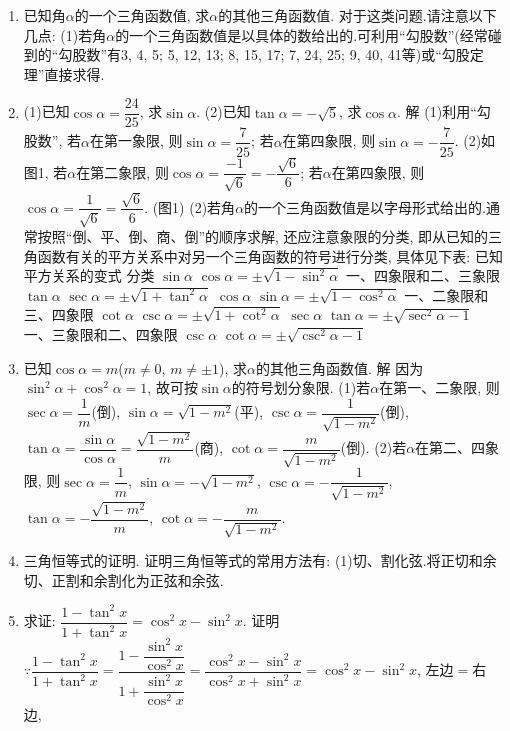 \documentclass[10pt,a4paper]{article}
\begin{document}
\begin{enumerate}[1.]

\item 已知角$\alpha$的一个三角函数值, 求$\alpha$的其他三角函数值.
对于这类问题.请注意以下几点:
(1)若角$\alpha$的一个三角函数值是以具体的数给出的.可利用``勾股数''(经常碰到的``勾股数''有3, 4, 5; 5, 12, 13; 8, 15, 17; 7, 24, 25; 9, 40, 41等)或``勾股定理''直接求得.
\item (1)已知$\cos \alpha =\dfrac{24}{25}$, 求$\sin \alpha$.		(2)已知$\tan \alpha =-\sqrt 5$, 求$\cos \alpha$.
解  (1)利用``勾股数'', 若$\alpha$在第一象限, 则$\sin \alpha =\dfrac 7{25}$; 若$\alpha$在第四象限, 则$\sin \alpha =-\dfrac 7{25}$.
(2)如图1, 若$\alpha$在第二象限, 则$\cos \alpha =\dfrac{-1}{\sqrt 6}=-\dfrac{\sqrt 6}6$; 若$\alpha$在第四象限, 则$\cos \alpha =\dfrac 1{\sqrt 6}=\dfrac{\sqrt 6}6$.
(图1)
(2)若角$\alpha$的一个三角函数值是以字母形式给出的.通常按照``倒、平、倒、商、倒''的顺序求解, 还应注意象限的分类, 即从已知的三角函数有关的平方关系中对另一个三角函数的符号进行分类, 具体见下表:
已知	平方关系的变式	分类
$\sin \alpha$	$\cos \alpha =\pm \sqrt {1-\sin ^2\alpha }$	一、四象限和二、三象限
$\tan \alpha$	$\sec \alpha =\pm \sqrt {1+\tan ^2\alpha }$	
$\cos \alpha$	$\sin \alpha =\pm \sqrt {1-\cos ^2\alpha }$	一、二象限和三、四象限
$\cot \alpha$	$\csc \alpha =\pm \sqrt {1+\cot ^2\alpha }$	
$\sec \alpha$	$\tan \alpha =\pm \sqrt {\sec ^2\alpha -1}$	一、三象限和二、四象限
$\csc \alpha$	$\cot \alpha =\pm \sqrt {\csc ^2\alpha -1}$	
\item 已知$\cos \alpha =m$($m\ne 0$, $m\ne \pm 1$), 求$\alpha$的其他三角函数值.
解  因为$\sin ^2\alpha +\cos ^2\alpha =1$, 故可按$\sin \alpha$的符号划分象限.
(1)若$\alpha$在第一、二象限, 则$\sec \alpha =\dfrac 1m$(倒), $\sin \alpha =\sqrt {1-m^2}$(平), $\csc \alpha =\dfrac 1{\sqrt {1-m^2}}$(倒), $\tan \alpha =\dfrac{\sin \alpha }{\cos \alpha }=\dfrac{\sqrt {1-m^2}}m$(商), $\cot \alpha =\dfrac m{\sqrt {1-m^2}}$(倒).
(2)若$\alpha$在第二、四象限, 则$\sec \alpha =\dfrac 1m$, $\sin \alpha =-\sqrt {1-m^2}$, $\csc \alpha =-\dfrac 1{\sqrt {1-m^2}}$, $\tan \alpha =-\dfrac{\sqrt {1-m^2}}m$, $\cot \alpha =-\dfrac m{\sqrt {1-m^2}}$.
\item 三角恒等式的证明.
证明三角恒等式的常用方法有:
(1)切、割化弦.将正切和余切、正割和余割化为正弦和余弦.
\item 求证: $\dfrac{1-\tan ^2x}{1+\tan ^2x}=\cos ^2x-\sin ^2x$.
证明  $\because \dfrac{1-\tan ^2x}{1+\tan ^2x}=\dfrac{1-\dfrac{\sin ^2x}{\cos ^2x}}{1+\dfrac{\sin ^2x}{\cos ^2x}}=\dfrac{\cos ^2x-\sin ^2x}{\cos ^2x+\sin ^2x}=\cos ^2x-\sin ^2x$, 左边$=$右边,

\end{enumerate}
\end{document}
